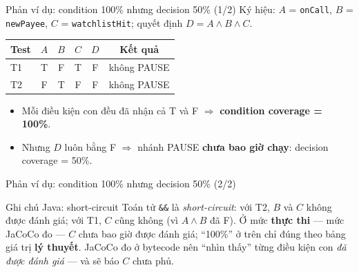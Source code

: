 \documentclass[aspectratio=169,12pt]{beamer}
\begin{document}
\begin{frame}{Phản ví dụ: condition 100\% nhưng decision 50\% (1/2)}
  Ký hiệu: $A$ = \texttt{onCall}, $B$ = \texttt{newPayee},
  $C$ = \texttt{watchlistHit}; quyết định $D = A \land B \land C$.

  \vspace{0.3em}
  \begin{center}
  \begin{tabular}{lccccc}
    \toprule
    \textbf{Test} & $A$ & $B$ & $C$ & $D$ & \textbf{Kết quả} \\
    \midrule
    T1 & T & F & T & F & không PAUSE \\
    T2 & F & T & F & F & không PAUSE \\
    \bottomrule
  \end{tabular}
  \end{center}

  \vspace{0.3em}
  \begin{itemize}
    \item Mỗi điều kiện con đều đã nhận cả T và F
          $\Rightarrow$ \textbf{condition coverage = 100\%}.
    \item Nhưng $D$ luôn bằng F $\Rightarrow$ nhánh PAUSE
          \textbf{chưa bao giờ chạy}: decision coverage = 50\%.
  \end{itemize}
\end{frame}

\begin{frame}{Phản ví dụ: condition 100\% nhưng decision 50\% (2/2)}
  \begin{alertblock}{Ghi chú Java: short-circuit}
    Toán tử \texttt{\&\&} là \textit{short-circuit}: với T2, $B$ và $C$
    không được đánh giá; với T1, $C$ cũng không (vì $A \land B$ đã F).
    Ở mức \textbf{thực thi} --- mức JaCoCo đo --- $C$ chưa bao giờ được
    đánh giá; ``100\%'' ở trên chỉ đúng theo bảng giá trị
    \textbf{lý thuyết}. JaCoCo đo ở bytecode nên ``nhìn thấy'' từng
    điều kiện con \textit{đã được đánh giá} --- và sẽ báo $C$ chưa phủ.
  \end{alertblock}
\end{frame}
\end{document}
